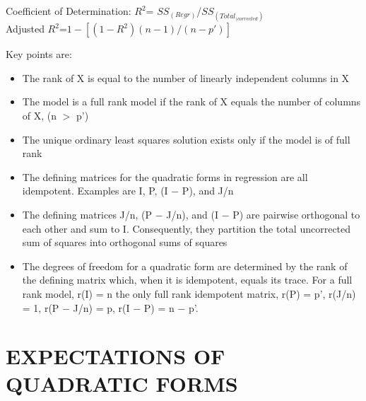 \documentclass[letterpaper,11pt]{article}
\begin{document}
{\begin{tabular}{|c c c c|}
\end{tabular}

Coefficient of Determination: $R^{2}$= $SS_{(Regr)}$/$SS_{(Total_{(corrected})}$ 
\\
Adjusted $R^{2}$=$1-[(1-R^{2})(n-1)/(n-p')]$
\bigskip


Key points are:
\begin{itemize}
\item  The rank of X is equal to the number of linearly independent columns in X
\item  The model is a full rank model if the rank of X equals the number of columns of X, (n $>$ p')
\item  The unique ordinary least squares solution exists only if the model is of full rank
\item  The defining matrices for the quadratic forms in regression are all idempotent. Examples are I, P, (I − P), and J/n
\item  The defining matrices J/n, (P − J/n), and (I − P) are pairwise orthogonal to each other and sum to I. Consequently, they partition
the total uncorrected sum of squares into orthogonal sums of squares
\item  The degrees of freedom for a quadratic form are determined by the rank of the defining matrix which, when it is idempotent, equals its
trace. For a full rank model, r(I) = n the only full rank idempotent matrix, r(P) = p', r(J/n) = 1, r(P − J/n) = p, r(I − P) = n − p'.
\end{itemize}

\section{EXPECTATIONS OF QUADRATIC FORMS}

}
\end{document}
